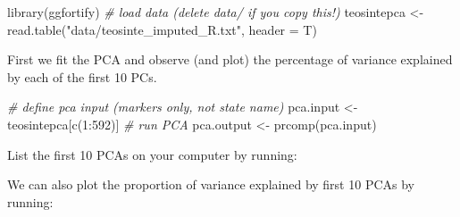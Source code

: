 \documentclass[
]{book}
\newenvironment{Shaded}{\begin{snugshade}}{\end{snugshade}}
\newcommand{\AttributeTok}[1]{\textcolor[rgb]{0.77,0.63,0.00}{#1}}
\newcommand{\CommentTok}[1]{\textcolor[rgb]{0.56,0.35,0.01}{\textit{#1}}}
\newcommand{\DecValTok}[1]{\textcolor[rgb]{0.00,0.00,0.81}{#1}}
\newcommand{\FloatTok}[1]{\textcolor[rgb]{0.00,0.00,0.81}{#1}}
\newcommand{\FunctionTok}[1]{\textcolor[rgb]{0.00,0.00,0.00}{#1}}
\newcommand{\NormalTok}[1]{#1}
\newcommand{\OtherTok}[1]{\textcolor[rgb]{0.56,0.35,0.01}{#1}}
\newcommand{\SpecialCharTok}[1]{\textcolor[rgb]{0.00,0.00,0.00}{#1}}
\newcommand{\StringTok}[1]{\textcolor[rgb]{0.31,0.60,0.02}{#1}}
\begin{document}
\begin{Shaded}
\begin{Highlighting}[]
\FunctionTok{library}\NormalTok{(ggfortify)}
\CommentTok{\# load data (delete \textquotesingle{}data/\textquotesingle{} if you copy this!)}
\NormalTok{teosintepca }\OtherTok{\textless{}{-}} \FunctionTok{read.table}\NormalTok{(}\StringTok{"data/teosinte\_imputed\_R.txt"}\NormalTok{, }\AttributeTok{header =}\NormalTok{ T)}
\end{Highlighting}
\end{Shaded}

First we fit the PCA and observe (and plot) the percentage of variance explained by each of the first 10 PCs.

\begin{Shaded}
\begin{Highlighting}[]
\CommentTok{\# define pca input (markers only, not state name)}
\NormalTok{pca.input }\OtherTok{\textless{}{-}}\NormalTok{ teosintepca[}\FunctionTok{c}\NormalTok{(}\DecValTok{1}\SpecialCharTok{:}\DecValTok{592}\NormalTok{)]}
\CommentTok{\# run PCA}
\NormalTok{pca.output }\OtherTok{\textless{}{-}} \FunctionTok{prcomp}\NormalTok{(pca.input)}
\end{Highlighting}
\end{Shaded}

List the first 10 PCAs on your computer by running:

\begin{Shaded}
\end{Shaded}

We can also plot the proportion of variance explained by first 10 PCAs by running:

\begin{Shaded}
\end{Shaded}
\end{document}

